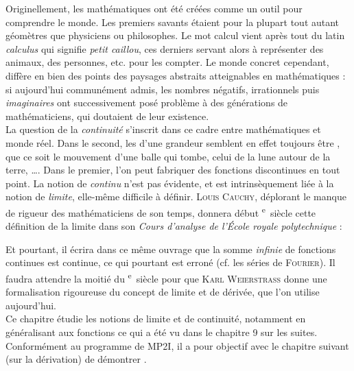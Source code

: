 \documentclass[a4paper,french,bookmarks]{article}
\begin{document}

Originellement, les mathématiques ont été créées comme un outil pour comprendre le monde. Les premiers savants étaient pour la plupart tout autant géomètres que physiciens ou philosophes. Le mot calcul vient après tout du latin \textit{calculus} qui signifie \textit{petit caillou}, ces derniers servant alors à représenter des animaux, des personnes, etc. pour les compter. Le monde concret cependant, diffère en bien des points des paysages abstraits atteignables en mathématiques : si aujourd'hui communément admis, les nombres négatifs, irrationnels puis \textit{imaginaires} ont successivement posé problème à des générations de mathématiciens, qui doutaient de leur existence.\\[3pt]
%
La question de la \textit{continuité} s'inscrit dans ce cadre entre mathématiques et monde réel. Dans le second, les  d'une grandeur semblent en effet toujours être , que ce soit le mouvement d'une balle qui tombe, celui de la lune autour de la terre, \dots. Dans le premier, l'on peut fabriquer des fonctions discontinues en tout point. La notion de \textit{continu} n'est pas évidente, et est intrinsèquement liée à la notion de \textit{limite}, elle-même difficile à définir. \textsc{Louis Cauchy}, déplorant le manque de rigueur des mathématiciens de son temps, donnera début \textsc{}\textsuperscript{e}~siècle cette définition de la limite dans son \textit{Cours d'analyse de l'École royale polytechnique} :
%
\begin{center}
    \begin{minipage}{0.9\linewidth}
        \qquad\quad {}
    \end{minipage}
\end{center}
%
Et pourtant, il écrira dans ce même ouvrage que la somme \textit{infinie} de fonctions continues est continue, ce qui pourtant est erroné (cf. les séries de \textsc{Fourier}). Il faudra attendre la moitié du \textsc{}\textsuperscript{e}~siècle pour que \textsc{Karl Weierstrass} donne une formalisation rigoureuse du concept de limite et de dérivée, que l'on utilise aujourd'hui.\\

Ce chapitre étudie les notions de limite et de continuité, notamment en généralisant aux fonctions ce qui a été vu dans le chapitre 9 sur les suites. Conformément au programme de \textsf{MP2I}, il a pour objectif avec le chapitre suivant (sur la dérivation) de démontrer .
\initcours{}
\end{document}
